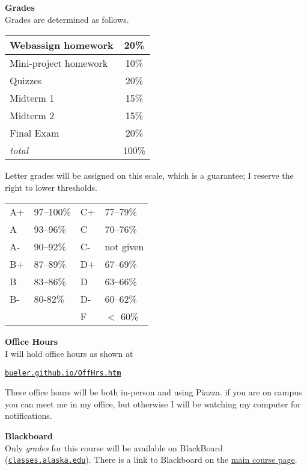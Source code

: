 \documentclass[12pt]{article}
\renewcommand{\emph}[1]{\textsf{\textbf{#1}}}
\newcommand{\localhead}[1]{\par\smallskip\textbf{#1}\nobreak\\}%
\def\heading#1{\localhead{\large\emph{#1}}}
\begin{document}
\heading{Grades}
Grades are determined as follows.
 
\begin{multicols}{2}

\begin{tabular}{|l|c|}
\hline
Webassign homework& 20\%\\
\hline
Mini-project homework & 10\% \\
\hline
Quizzes& 20\% \\
\hline
Midterm 1 & 15\% \\
\hline
Midterm 2 & 15\%  \\
\hline
Final Exam& 20\% \\
\hline
\textsl{total} & 100\%\\
\hline
\end{tabular}

\vskip 25pt

Letter grades will be assigned on this scale, which is a guarantee; I reserve the right to lower thresholds. 

\begin{tabular}{llll}
A+ & 97--100\% \quad\strut & C+ & 77--79\% \\
A & 93--96\% &  C & 70--76\% \\
A- & 90--92\% & C- & not given \\
B+ & 87--89\% & D+ & 67--69\% \\
B &  83--86\% & D & 63--66\% \\
B- & 80-82\% & D- & 60--62\% \\
 & & F  & $<$ 60\%
\end{tabular}
\end{multicols}


\vspace{-0.3in}

\heading{Office Hours}
I will hold office hours as shown at

\smallskip
\centerline{\href{http://bueler.github.io/OffHrs.htm}{\tt bueler.github.io/OffHrs.htm}}

These office hours will be both in-person and using Piazza.  if you are on campus you can meet me in my office, but otherwise I will be watching my computer for notifications.


\heading{Blackboard}
Only \textsl{grades} for this course will be available on BlackBoard (\href{https://classes.alaska.edu/}{\tt classes.alaska.edu}).  There is a link to Blackboard on the \href{https://bueler.github.io/math302/}{main course page}.
\end{document}
